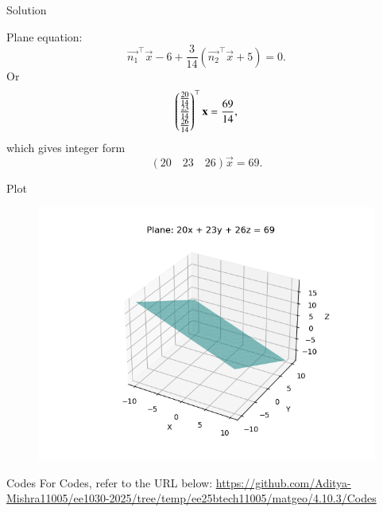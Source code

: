 \documentclass{beamer}
\begin{document}
\begin{frame}{Solution}

Plane equation:
\[
\vec{n_1}^\top \vec{x} - 6 + \frac{3}{14} \left(\vec{n_2}^\top \vec{x} + 5 \right) = 0.
\]
Or
\[
\begin{pmatrix}\frac{20}{14} \\ \frac{23}{14} \\ \frac{26}{14}\end{pmatrix}^\top \mathbf{x} = \frac{69}{14},
\]
which gives integer form
\[
\boxed{
(20 \quad 23 \quad 26) \vec{x} = 69
}.
\]
\end{frame}
\begin{frame}{Plot}
\begin{figure}
    \centering
    \includegraphics[width=0.8\columnwidth]{Figs/Figure.png}
\end{figure}
\end{frame}

\begin{frame}{Codes}
\centering
For Codes, refer to the URL below:  
\url{https://github.com/Aditya-Mishra11005/ee1030-2025/tree/temp/ee25btech11005/matgeo/4.10.3/Codes}
\end{frame}
\end{document}
